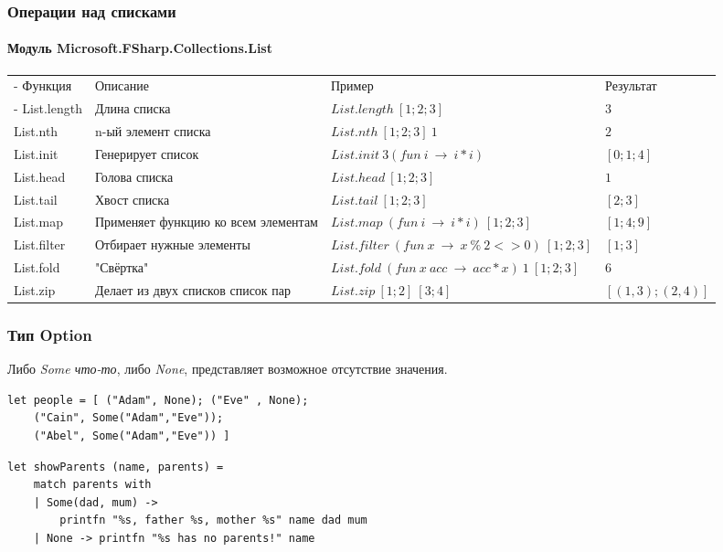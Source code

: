 \documentclass[xetex,mathserif,serif]{beamer}
\begin{document}
	\begin{frame}
		\frametitle{Операции над списками}
		\framesubtitle{Модуль Microsoft.FSharp.Collections.List}
		\begin{small}
			\begin{tabu} {| X[0.5 l p] | X[1 l p] | X[1 l p] | X[0.5 l p] |}
				\tabucline-
				Функция                & Описание                            & Пример                                              & Результат            \\
				\tabucline-
				\everyrow{\tabucline-}
				List.length            & Длина списка                        & $List.length\ [1;2;3]$                              & $3$                  \\
				List.nth               & n-ый элемент списка                 & $List.nth\ [1; 2; 3]\ 1$                            & $2$                  \\
				List.init              & Генерирует список                   & $List.init\ 3 (fun\ i\ \rightarrow\ i * i)$         & $[0; 1; 4]$          \\
				List.head              & Голова списка                       & $List.head\ [1; 2; 3]$                              & $1$                  \\
				List.tail              & Хвост списка                        & $List.tail\ [1; 2; 3]$                              & $[2; 3]$             \\
				List.map               & Применяет функцию ко всем элементам & $List.map\ (fun\ i\ \rightarrow\ i * i)\ [1; 2; 3]$ & $[1; 4; 9]$          \\
				List.filter            & Отбирает нужные элементы            & $List.filter\ (fun\ x\ \rightarrow\ x\ \%\ 2 <> 0)\ [1; 2; 3]$ & $[1; 3]$  \\
				List.fold              & "Свёртка"  & $List.fold\ (fun\ x\ acc\ \rightarrow\ acc * x)\ 1\ [1; 2; 3]$               & $6$                  \\
				List.zip               & Делает из двух списков список пар   & $List.zip\ [1; 2]\ [3; 4]$                          & $[(1, 3); (2, 4)]$   \\
			\end{tabu}
		\end{small}
	\end{frame}
	
	\begin{frame}[fragile]
		\frametitle{Тип Option}
		Либо \textit{Some что-то}, либо \textit{None}, представляет возможное отсутствие значения.
		\begin{verbatim}
let people = [ ("Adam", None); ("Eve" , None);
    ("Cain", Some("Adam","Eve"));
    ("Abel", Some("Adam","Eve")) ]
		\end{verbatim}
		\begin{verbatim}
let showParents (name, parents) =
    match parents with
    | Some(dad, mum) -> 
        printfn "%s, father %s, mother %s" name dad mum
    | None -> printfn "%s has no parents!" name
		\end{verbatim}
	\end{frame}
\end{document}
